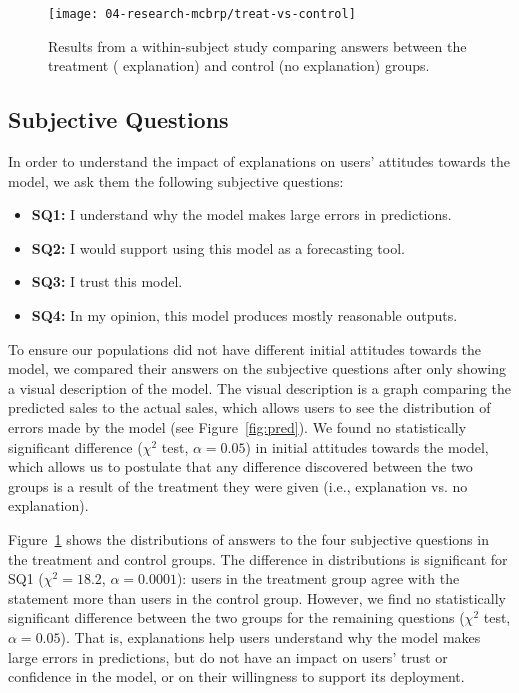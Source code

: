 \begin{figure}[]
 \centering
 \texttt{[image: 04-research-mcbrp/treat-vs-control]}
  \caption{Results from a within-subject study comparing answers between the treatment (\OurMethod{} explanation) and control (no explanation) groups.}
 \label{fig:treat-vs-control}
\end{figure}

\subsection{Subjective Questions}
In order to understand the impact of \OurMethod{} explanations on users' attitudes towards the model, we ask them the following subjective questions:
\begin{itemize}
	\item \textbf{SQ1:} I understand why the model makes large errors in predictions.
	\item \textbf{SQ2:} I would support using this model as a forecasting tool.
	\item \textbf{SQ3:} I trust this model.
	\item \textbf{SQ4:} In my opinion, this model produces mostly reasonable outputs.
\end{itemize}



To ensure our populations did not have different initial attitudes towards the model, we compared their answers on the subjective questions after only showing a visual description of the model. 
The visual description is a graph comparing the predicted sales to the actual sales, which allows users to see the distribution of errors made by the model (see Figure~\ref{fig:pred}). 
We found no statistically significant difference ($\chi^{2}$ test, $\alpha = 0.05$) in initial attitudes towards the model, which allows us to postulate that any difference discovered between the two groups is a result of the treatment they were given (i.e., \OurMethod{} explanation vs. no explanation). 

Figure~\ref{fig:treat-vs-control} shows the distributions of answers to the four subjective questions in the treatment and control groups. 
The difference in distributions is significant for SQ1 ($\chi^{2} = 18.2$, $\alpha = 0.0001$): users in the treatment group agree with the statement more than users in the control group. 
However, we find no statistically significant difference between the two groups for the remaining questions ($\chi^{2}$ test, $\alpha = 0.05$). 
That is, \OurMethod{} explanations help users understand why the model makes large errors in predictions, but do not have an impact on users' trust or confidence in the model, or on their willingness to support its deployment. 

